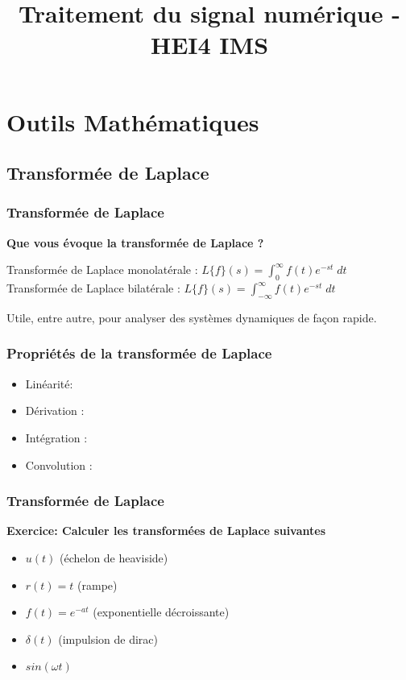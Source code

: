\documentclass{beamer}
\title[Traitement du signal numérique]{Traitement du signal numérique - HEI4 IMS}
\author[Antony Bazir]{}
\begin{document}
\section{Outils Mathématiques}
\subsection{Transformée de Laplace}

\begin{frame}
\frametitle{Transformée de Laplace}
\textbf{Que vous évoque la transformée de Laplace ?}\\

\vspace{1cm}

{
	Transformée de Laplace monolatérale : $L\{f\}(s) = \displaystyle \int^{\infty}_{0} f(t) e^{-st} \; dt$\\ 
	\vspace{0.3cm}
	Transformée de Laplace bilatérale : $L\{f\}(s) = \displaystyle \int^{\infty}_{-\infty} f(t) e^{-st} \; dt$
}

{
\begin{block}{}
Utile, entre autre, pour analyser des systèmes dynamiques de façon rapide.
\end{block}
}

\end{frame}

\begin{frame}
\frametitle{Propriétés de la transformée de Laplace}
\begin{itemize}
\item<2-> Linéarité: 
\item<4-> Dérivation : 
\item<5-> Intégration : 
\item<7-> Convolution : 
\end{itemize}

\end{frame}

\begin{frame} 
\frametitle{Transformée de Laplace}

\textbf{Exercice: Calculer les transformées de Laplace suivantes}\\
\vspace{1cm}
\begin{itemize}
\item $u(t)$ (échelon de heaviside)
\item $r(t) = t$ (rampe)
\item $f(t) = e^{-at}$ (exponentielle décroissante)
\item $\delta (t)$ (impulsion de dirac) 
\item $sin(\omega t)$
\end{itemize}

\end{frame} 
\end{document}
